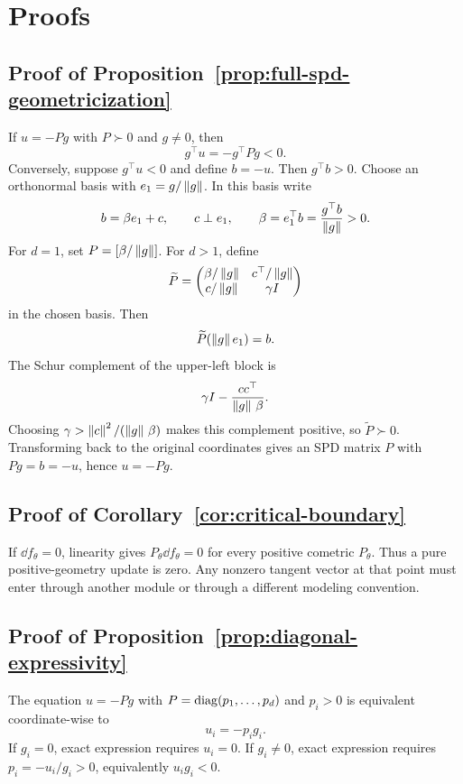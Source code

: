 \section{Proofs}
\label{app:proofs}

\subsection{Proof of Proposition~\ref{prop:full-spd-geometricization}}

If $u=-Pg$ with $P\succ0$ and $g\neq0$, then
\[
g^\top u=-g^\top Pg<0.
\]
Conversely, suppose $g^\top u<0$ and define $b=-u$.  Then $g^\top b>0$.
Choose an orthonormal basis with $e_1=g/\left\lVert g\right\rVert$.  In this basis write
\[
b=\beta e_1+c,\qquad c\perp e_1,
\qquad
\beta=e_1^\top b=\frac{g^\top b}{\left\lVert g\right\rVert}>0.
\]
For $d=1$, set $P=[\beta/\left\lVert g\right\rVert]$.  For $d>1$, define
\[
\widetilde P
=
\begin{pmatrix}
\beta/\left\lVert g\right\rVert & c^\top/\left\lVert g\right\rVert\\
c/\left\lVert g\right\rVert & \gamma I
\end{pmatrix}
\]
in the chosen basis.  Then
\[
\widetilde P(\left\lVert g\right\rVert e_1)=b.
\]
The Schur complement of the upper-left block is
\[
\gamma I-\frac{cc^\top}{\left\lVert g\right\rVert\,\beta}.
\]
Choosing $\gamma>\left\lVert c\right\rVert^2/(\left\lVert g\right\rVert\,\beta)$ makes this complement positive,
so $\widetilde P\succ0$.  Transforming back to the original coordinates gives
an SPD matrix $P$ with $Pg=b=-u$, hence $u=-Pg$.

\subsection{Proof of Corollary~\ref{cor:critical-boundary}}

If $\dd f_\theta=0$, linearity gives $P_\theta\dd f_\theta=0$ for every
positive cometric $P_\theta$.  Thus a pure positive-geometry update is zero.
Any nonzero tangent vector at that point must enter through another module or
through a different modeling convention.

\subsection{Proof of Proposition~\ref{prop:diagonal-expressivity}}

The equation $u=-Pg$ with $P=\operatorname{diag}(p_1,\ldots,p_d)$ and $p_i>0$ is equivalent
coordinate-wise to
\[
u_i=-p_i g_i.
\]
If $g_i=0$, exact expression requires $u_i=0$.  If $g_i\neq0$, exact
expression requires $p_i=-u_i/g_i>0$, equivalently $u_i g_i<0$.

